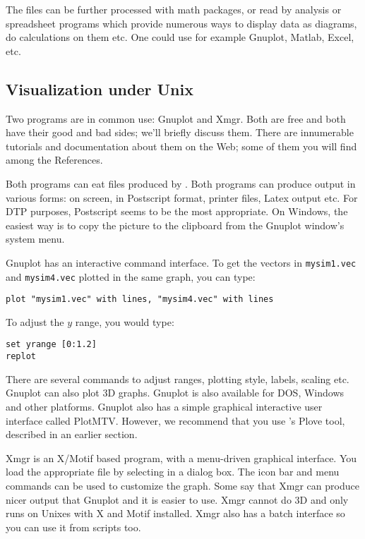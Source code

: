 The files can be further processed with math packages, or read 
by analysis or spreadsheet programs which provide numerous ways 
to display data as diagrams, do calculations on them etc. One 
could use for example Gnuplot, Matlab, Excel, etc.





\subsection{Visualization under Unix}

Two programs are in common use: Gnuplot and Xmgr. Both are free 
and both have their good and bad sides; we'll briefly discuss 
them. There are innumerable tutorials and documentation about 
them on the Web; some of them you will find among the References.


Both programs can eat files produced by . Both
programs can produce output in various forms: on screen, in Postscript
format, printer files, Latex output etc. For DTP purposes, Postscript
seems to be the most appropriate. On Windows, the easiest way is to
copy the picture to the clipboard from the Gnuplot window's system
menu.


Gnuplot has an interactive command interface. To get the vectors in
\texttt{mysim1.vec} and \texttt{mysim4.vec} plotted in the same graph,
you can type:

\begin{Verbatim}
plot "mysim1.vec" with lines, "mysim4.vec" with lines
\end{Verbatim}

To adjust the $y$ range, you would type:

\begin{Verbatim}
set yrange [0:1.2]
replot
\end{Verbatim}


There are several commands to adjust ranges, plotting style, labels,
scaling etc. Gnuplot can also plot 3D graphs. Gnuplot
is also available for DOS, Windows and other platforms. Gnuplot also
has a simple graphical interactive user interface called PlotMTV.
However, we recommend that you use {\opp}'s Plove tool, described in
an earlier section.


Xmgr is an X/Motif based program, with a menu-driven
graphical interface. You load the appropriate file by selecting in a
dialog box. The icon bar and menu commands can be used to customize
the graph. Some say that Xmgr can produce nicer output that Gnuplot
and it is easier to use. Xmgr cannot do 3D and only runs on Unixes
with X and Motif installed. Xmgr also has a batch interface so you can
use it from scripts too.



